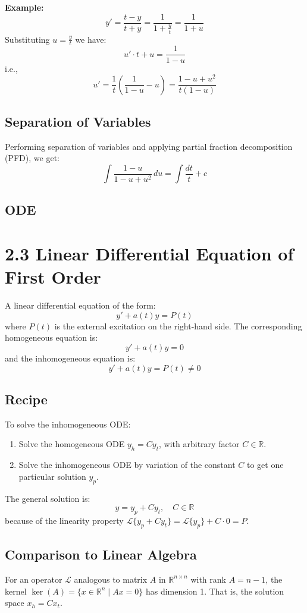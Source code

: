 \documentclass[11pt]{article}
\begin{document}
\textbf{Example:}
\[ y' = \frac{t - y}{t + y} = \frac{1}{1 + \frac{y}{t}} = \frac{1}{1 + u} \]
Substituting \( u = \frac{y}{t} \) we have:
\[ u' \cdot t + u = \frac{1}{1 - u} \]
i.e.,
\[ u' = \frac{1}{t} \left(\frac{1}{1 - u} - u\right) = \frac{1 - u + u^2}{t(1 - u)} \]


\subsection*{Separation of Variables}

Performing separation of variables and applying partial fraction decomposition (PFD), we get:
\[
\int \frac{1-u}{1-u+u^2} \, du = \int \frac{dt}{t} + c
\]

\newpage
\date{15.11.2023}
\subsection*{ODE}



\section*{2.3 Linear Differential Equation of First Order}

A linear differential equation of the form:
\[
y' + a(t)y = P(t)
\]
where \( P(t) \) is the external excitation on the right-hand side. The corresponding homogeneous equation is:
\[
y' + a(t)y = 0
\]
and the inhomogeneous equation is:
\[
y' + a(t)y = P(t) \neq 0
\]

\subsection*{Recipe}
To solve the inhomogeneous ODE:
\begin{enumerate}
    \item Solve the homogeneous ODE \( y_h = C y_t \), with arbitrary factor \( C \in \mathbb{R} \).
    \item Solve the inhomogeneous ODE by variation of the constant \( C \) to get one particular solution \( y_p \).
\end{enumerate}
The general solution is:
\[
y = y_p + C y_t, \quad C \in \mathbb{R}
\]
because of the linearity property \( \mathcal{L}\{y_p + C y_t\} = \mathcal{L}\{y_p\} + C \cdot 0 = P \).

\subsection*{Comparison to Linear Algebra}
For an operator \( \mathcal{L} \) analogous to matrix \( A \) in \( \mathbb{R}^{n \times n} \) with rank \( A = n-1 \), the kernel \( \ker(A) = \{ x \in \mathbb{R}^n \mid Ax = 0 \} \) has dimension 1. That is, the solution space \( x_h = C x_t \).
\end{document}
